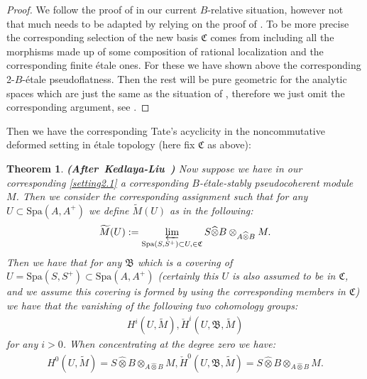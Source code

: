 \documentclass[12pt]{amsart}
\newtheorem{theorem}{Theorem}[section]
\theoremstyle{definition}
\numberwithin{equation}{section}
\begin{document}
\begin{proof}
We follow the proof of \cite[Lemma 2.5.10]{KL2} in our current $B$-relative situation, however not that much needs to be adapted by relying on the proof of \cite[Lemma 2.5.10]{KL2}. To be more precise the corresponding selection of the new basis $\mathfrak{C}$ comes from including all the morphisms made up of some composition of rational localization and the corresponding finite \'etale ones. For these we have shown above the corresponding 2-$B$-\'etale pseudoflatness. Then the rest will be pure geometric for the analytic spaces which are just the same as the situation of \cite[Lemma 2.5.10]{KL2}, therefore we just omit the corresponding argument, see \cite[Lemma 2.5.10]{KL2}.	
\end{proof}


\indent Then we have the corresponding Tate's acyclicity in the noncommutative deformed setting in \'etale topology (here fix $\mathfrak{C}$ as above):




\begin{theorem}\mbox{\bf{(After Kedlaya-Liu \cite[Theorem 2.5.11]{KL2})}} \label{theorem2.19} Now suppose we have in our corresponding \cref{setting2.1} a corresponding $B$-\'etale-stably pseudocoherent module $M$. Then we consider the corresponding assignment such that for any $U\subset \mathrm{Spa}(A,A^+)$ we define $\widetilde{M}(U)$ as in the following:
\begin{align}
\widetilde{M}(U):=\varprojlim_{\mathrm{Spa}(S,S^+)\subset U,\in \mathfrak{C}} S\widehat{\otimes}B\otimes_{A\widehat{\otimes}B}M.	
\end{align}
Then we have that for any $\mathfrak{B}$ which is a covering of $U=\mathrm{Spa}(S,S^+)\subset \mathrm{Spa}(A,A^+)$ (certainly this $U$ is also assumed to be in $\mathfrak{C}$, and we assume this covering is formed by using the corresponding members in $\mathfrak{C}$) we have that the vanishing of the following two cohomology groups:
\begin{align}
H^i(U,\widetilde{M}), \check{H}^i(U,\mathfrak{B},\widetilde{M})
\end{align}
for any $i>0$. When concentrating at the degree zero we have:
\begin{align}
H^0(U,\widetilde{M})=S\widehat{\otimes}B\otimes_{A\widehat{\otimes}B}M, \check{H}^0(U,\mathfrak{B},\widetilde{M})=S\widehat{\otimes}B\otimes_{A\widehat{\otimes}B}M.
\end{align}
	
\end{theorem}
 	
\end{document}
